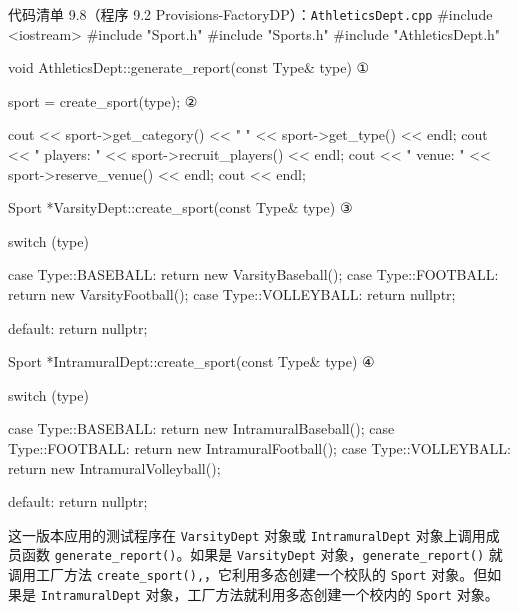 \begin{codeboxt}{代码清单 9.8（程序 9.2 Provisions-FactoryDP）：\texttt{Athletics\allowbreak{}Dept.\allowbreak{}cpp}}
#include <iostream>
#include "Sport.h"
#include "Sports.h"
#include "AthleticsDept.h"

void AthleticsDept::generate_report(const Type& type)  ①
{
    sport = create_sport(type);                        ②

    cout << sport->get_category() << " "
         << sport->get_type() << endl;
    cout << "  players: " << sport->recruit_players() << endl;
    cout << "    venue: " << sport->reserve_venue()   << endl;
    cout << endl;
}

Sport *VarsityDept::create_sport(const Type& type)    ③
{
    switch (type)
    {
        case Type::BASEBALL:   return new VarsityBaseball();
        case Type::FOOTBALL:   return new VarsityFootball();
        case Type::VOLLEYBALL: return nullptr;

        default: return nullptr;
    }
}

Sport *IntramuralDept::create_sport(const Type& type) ④
{
    switch (type)
    {
        case Type::BASEBALL:   return new IntramuralBaseball();
        case Type::FOOTBALL:   return new IntramuralFootball();
        case Type::VOLLEYBALL: return new IntramuralVolleyball();

        default: return nullptr;
    }
}
\end{codeboxt}
\par
{}\par
{}\par
{}\par


这一版本应用的测试程序在 \texttt{Varsity\allowbreak{}Dept} 对象或 \texttt{Intramural\allowbreak{}Dept} 对象上调用成员函数 \texttt{generate\_\allowbreak{}report(\allowbreak{})\allowbreak{}}。如果是 \texttt{Varsity\allowbreak{}Dept} 对象，\texttt{generate\_\allowbreak{}report(\allowbreak{})\allowbreak{}} 就调用工厂方法 \texttt{create\_\allowbreak{}sport(\allowbreak{})\allowbreak{},\allowbreak{}}，它利用多态创建一个校队的 \texttt{Sport} 对象。但如果是 \texttt{Intramural\allowbreak{}Dept} 对象，工厂方法就利用多态创建一个校内的 \texttt{Sport} 对象。

